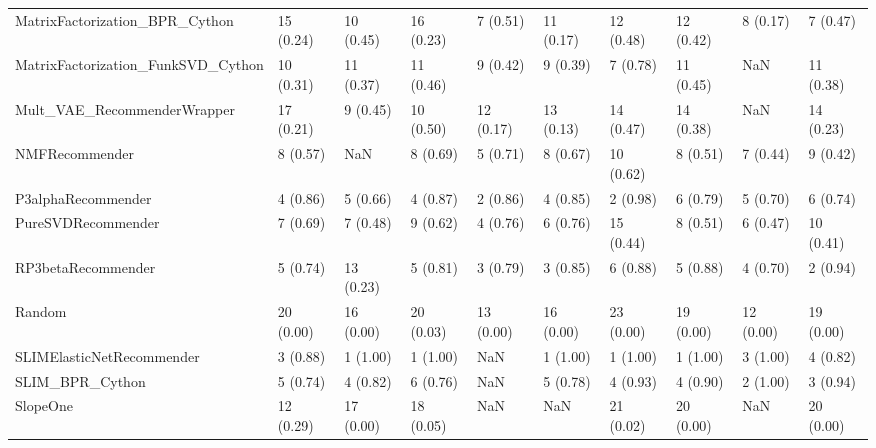 \begin{tabular}{llllllllll}
     MatrixFactorization\_BPR\_Cython &                15 (0.24) &   10 (0.45) &     16 (0.23) &     7 (0.51) &            11 (0.17) &           12 (0.48) &         12 (0.42) &           8 (0.17) &          7 (0.47) \\
 MatrixFactorization\_FunkSVD\_Cython &                10 (0.31) &   11 (0.37) &     11 (0.46) &     9 (0.42) &             9 (0.39) &            7 (0.78) &         11 (0.45) &                NaN &         11 (0.38) \\
        Mult\_VAE\_RecommenderWrapper &                17 (0.21) &    9 (0.45) &     10 (0.50) &    12 (0.17) &            13 (0.13) &           14 (0.47) &         14 (0.38) &                NaN &         14 (0.23) \\
                     NMFRecommender &                 8 (0.57) &         NaN &      8 (0.69) &     5 (0.71) &             8 (0.67) &           10 (0.62) &          8 (0.51) &           7 (0.44) &          9 (0.42) \\
                 P3alphaRecommender &                 4 (0.86) &    5 (0.66) &      4 (0.87) &     2 (0.86) &             4 (0.85) &            2 (0.98) &          6 (0.79) &           5 (0.70) &          6 (0.74) \\
                 PureSVDRecommender &                 7 (0.69) &    7 (0.48) &      9 (0.62) &     4 (0.76) &             6 (0.76) &           15 (0.44) &          8 (0.51) &           6 (0.47) &         10 (0.41) \\
                 RP3betaRecommender &                 5 (0.74) &   13 (0.23) &      5 (0.81) &     3 (0.79) &             3 (0.85) &            6 (0.88) &          5 (0.88) &           4 (0.70) &          2 (0.94) \\
                             Random &                20 (0.00) &   16 (0.00) &     20 (0.03) &    13 (0.00) &            16 (0.00) &           23 (0.00) &         19 (0.00) &          12 (0.00) &         19 (0.00) \\
          SLIMElasticNetRecommender &                 3 (0.88) &    1 (1.00) &      1 (1.00) &          NaN &             1 (1.00) &            1 (1.00) &          1 (1.00) &           3 (1.00) &          4 (0.82) \\
                    SLIM\_BPR\_Cython &                 5 (0.74) &    4 (0.82) &      6 (0.76) &          NaN &             5 (0.78) &            4 (0.93) &          4 (0.90) &           2 (1.00) &          3 (0.94) \\
                           SlopeOne &                12 (0.29) &   17 (0.00) &     18 (0.05) &          NaN &                  NaN &           21 (0.02) &         20 (0.00) &                NaN &         20 (0.00) \\

\end{tabular}
